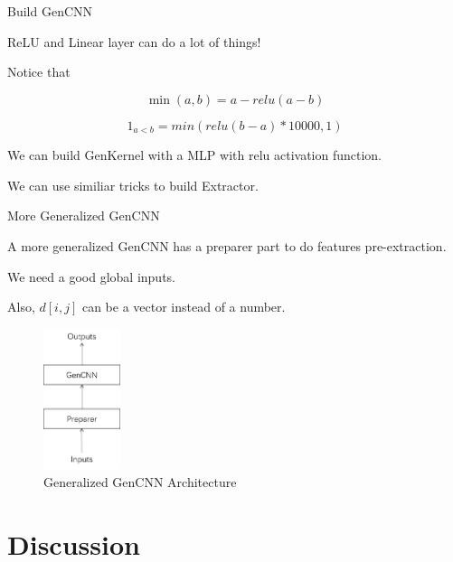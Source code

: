 \documentclass[serif]{beamer}
\begin{document}
\begin{frame}{Build GenCNN}

	ReLU and Linear layer can do a lot of things!

	Notice that 
    
    $$\min(a, b) = a - relu(a - b)$$

    $$1_{a<b} = min(relu(b-a)*10000,1)$$

	We can build GenKernel with a MLP with relu activation function.

    We can use similiar tricks to build Extractor.

\end{frame}

\begin{frame}{More Generalized GenCNN}

	A more generalized GenCNN has a preparer part to do features pre-extraction.

	We need a good global inputs.

	Also, $d[i,j]$ can be a vector instead of a number.

	\begin{figure}[H] %
		\centering %
		\includegraphics[width=0.2\textwidth]{../image/gen.png} %
		\caption{Generalized GenCNN Architecture} %
		\label{Fig.GenCNN} %
	\end{figure}

\end{frame}

\section{Discussion}
\end{document}
